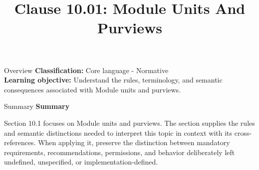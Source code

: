 \documentclass[10pt,letterpaper]{article}
\title{Clause 10.01: Module Units And Purviews}
\author{}
\date{}
\begin{document}
\maketitle
\begin{CornellOverviewBox}{Overview}
\textbf{Classification:} Core language - Normative\\[2pt]
\textbf{Learning objective:} Understand the rules, terminology, and semantic consequences associated with Module units and purviews.
\end{CornellOverviewBox}\begin{CornellSummaryBox}{Summary}
{\sffamily\bfseries\color{Accent} Summary}\par\vspace{3pt}Section 10.1 focuses on Module units and purviews. The section supplies the rules and semantic distinctions needed to interpret this topic in context with its cross-references. When applying it, preserve the distinction between mandatory requirements, recommendations, permissions, and behavior deliberately left undefined, unspecified, or implementation-defined.
\end{CornellSummaryBox}
\end{document}
